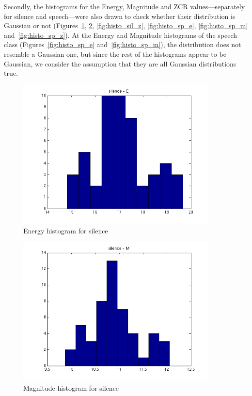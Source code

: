 \documentclass{article}
\begin{document}
Secondly, the histograms for the Energy, Magnitude and ZCR values---separately for silence and speech---were also drawn to check whether their distribution is Gaussian or not (Figures~\ref{fig:histo_sil_e}, \ref{fig:histo_sil_m}, \ref{fig:histo_sil_z}, \ref{fig:histo_sp_e}, \ref{fig:histo_sp_m} and~\ref{fig:histo_sp_z}). At the Energy and Magnitude histograms of the speech class (Figures~\ref{fig:histo_sp_e} and~\ref{fig:histo_sp_m}), the distribution does not resemble a Gaussian one, but since the rest of the histograms appear to be Gaussian, we consider the assumption that they are all Gaussian distributions true.

\begin{figure}[h!]
  \centering
  \includegraphics[width=0.9\textwidth]{histo_sil_e}
  \caption{Energy histogram for silence}
  \label{fig:histo_sil_e}
\end{figure} 
\begin{figure}[h!]
  \centering
  \includegraphics[width=0.9\textwidth]{histo_sil_m}
  \caption{Magnitude histogram for silence}
  \label{fig:histo_sil_m}
\end{figure} 
\end{document}
